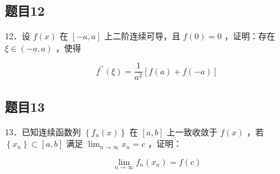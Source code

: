 \documentclass{article}
\begin{document}
\subsection{题目12}
12．设 \(f(x)\) 在 \([-a, a]\) 上二阶连续可导，且 \(f(0)=0\) ，证明：存在 \(\xi \in(-a, a)\) ，使得

\[
f^{\prime \prime}(\xi)=\frac{1}{a^{2}}[f(a)+f(-a)]
\]

\subsection{题目13}
13．已知连续函数列 \(\left\{f_{n}(x)\right\}\) 在 \([a, b]\) 上一致收敛于 \(f(x)\) ，若 \(\left\{x_{n}\right\} \subset[a, b]\) 满足 \(\lim _{n \rightarrow \infty} x_{n}=c\) ，证明：

\[
\lim _{n \rightarrow \infty} f_{n}\left(x_{n}\right)=f(c)
\]
\end{document}
